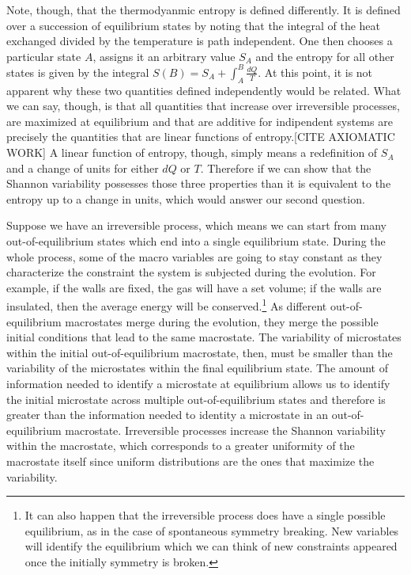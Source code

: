 \documentclass{article}
\begin{document}
Note, though, that the thermodyanmic entropy is defined differently. It is defined over a succession of equilibrium states by noting that the integral of the heat exchanged divided by the temperature is path independent. One then chooses a particular state $A$, assigns it an arbitrary value $S_A$ and the entropy for all other states is given by the integral $S(B) = S_A + \int_A^B \frac{dQ}{T}$. At this point, it is not apparent why these two quantities defined independently would be related. What we can say, though, is that all quantities that increase over irreversible processes, are maximized at equilibrium and that are additive for indipendent systems are precisely the quantities that are linear functions of entropy.[CITE AXIOMATIC WORK] A linear function of entropy, though, simply means a redefinition of $S_A$ and a change of units for either $dQ$ or $T$. Therefore if we can show that the Shannon variability possesses those three properties than it is equivalent to the entropy up to a change in units, which would answer our second question.

Suppose we have an irreversible process, which means we can start from many out-of-equilibrium states which end into a single equilibrium state. During the whole process, some of the macro variables are going to stay constant as they characterize the constraint the system is subjected during the evolution. For example, if the walls are fixed, the gas will have a set volume; if the walls are insulated, then the average energy will be conserved.\footnote{It can also happen that the irreversible process does have a single possible equilibrium, as in the case of spontaneous symmetry breaking. New variables will identify the equilibrium which we can think of new constraints appeared once the initially symmetry is broken.} As different out-of-equilibrium macrostates merge during the evolution, they merge the possible initial conditions that lead to the same macrostate. The variability of microstates within the initial out-of-equilibrium macrostate, then, must be smaller than the variability of the microstates within the final equilibrium state. The amount of information needed to identify a microstate at equilibrium allows us to identify the initial microstate across multiple out-of-equilibrium states and therefore is greater than the information needed to identity a microstate in an out-of-equilibrium macrostate. Irreversible processes increase the Shannon variability within the macrostate, which corresponds to a greater uniformity of the macrostate itself since uniform distributions are the ones that maximize the variability.
\end{document}
